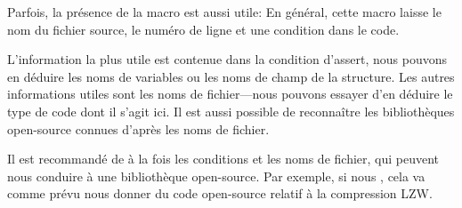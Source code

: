 
Parfois, la présence de la macro  est aussi utile:
En général, cette macro laisse le nom du fichier source, le numéro de ligne et une
condition dans le code.

L'information la plus utile est contenue dans la condition d'assert, nous pouvons
en déduire les noms de variables ou les noms de champ de la structure. Les autres
informations utiles sont les noms de fichier---nous pouvons essayer d'en déduire
le type de code dont il s'agit ici.
Il est aussi possible de reconnaître les bibliothèques open-source connues d'après
les noms de fichier.



Il est recommandé de  à la fois les conditions et les noms de fichier,
qui peuvent nous conduire à une bibliothèque open-source.
Par exemple, si nous  , cela va comme
prévu nous donner du code open-source relatif à la compression LZW.
